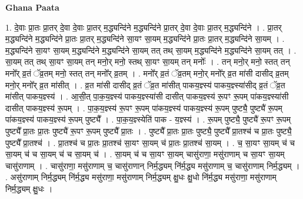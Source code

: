 \documentclass[17pt]{extarticle}
\begin{document}
\textbf{Ghana Paata } \newline

1. दे॒वाः प्रा॒तः प्रा॒तर् दे॒वा दे॒वाः प्रा॒तर् म॒द्ध्यन्दि॑ने म॒द्ध्यन्दि॑ने प्रा॒तर् दे॒वा दे॒वाः प्रा॒तर् म॒द्ध्यन्दि॑ने । . प्रा॒तर् म॒द्ध्यन्दि॑ने म॒द्ध्यन्दि॑ने प्रा॒तः प्रा॒तर् म॒द्ध्यन्दि॑ने सा॒यꣳ सा॒यम् म॒द्ध्यन्दि॑ने प्रा॒तः प्रा॒तर् म॒द्ध्यन्दि॑ने सा॒यम् । . म॒द्ध्यन्दि॑ने सा॒यꣳ सा॒यम् म॒द्ध्यन्दि॑ने म॒द्ध्यन्दि॑ने सा॒यम् तत् तथ् सा॒यम् म॒द्ध्यन्दि॑ने म॒द्ध्यन्दि॑ने सा॒यम् तत् । . सा॒यम् तत् तथ् सा॒यꣳ सा॒यम् तन् मनो॒र् मनो॒ स्तथ् सा॒यꣳ सा॒यम् तन् मनोः᳚ । . तन् मनो॒र् मनो॒ स्तत् तन् मनो᳚र् व्र॒तं ॅव्र॒तम् मनो॒ स्तत् तन् मनो᳚र् व्र॒तम् । . मनो᳚र् व्र॒तं ॅव्र॒तम् मनो॒र् मनो᳚र् व्र॒त मा॑सी दासीद् व्र॒तम् मनो॒र् मनो᳚र् व्र॒त मा॑सीत् । . व्र॒त मा॑सी दासीद् व्र॒तं ॅव्र॒त मा॑सीत् पाकय॒ज्ञ्स्य॑ पाकय॒ज्ञ्स्या॑सीद् व्र॒तं ॅव्र॒त मा॑सीत् पाकय॒ज्ञ्स्य॑ । . आ॒सी॒त् पा॒क॒य॒ज्ञ्स्य॑ पाकय॒ज्ञ्स्या॑सी दासीत् पाकय॒ज्ञ्स्य॑ रू॒पꣳ रू॒पम् पा॑कय॒ज्ञ्स्या॑सी दासीत् पाकय॒ज्ञ्स्य॑ रू॒पम् । . पा॒क॒य॒ज्ञ्स्य॑ रू॒पꣳ रू॒पम् पा॑कय॒ज्ञ्स्य॑ पाकय॒ज्ञ्स्य॑ रू॒पम् पुष्ट्यै॒ पुष्ट्यै॑ रू॒पम् पा॑कय॒ज्ञ्स्य॑ पाकय॒ज्ञ्स्य॑ रू॒पम् पुष्ट्यै᳚ । . पा॒क॒य॒ज्ञ्स्येति॑ पाक - य॒ज्ञ्स्य॑ । . रू॒पम् पुष्ट्यै॒ पुष्ट्यै॑ रू॒पꣳ रू॒पम् पुष्ट्यै᳚ प्रा॒तः प्रा॒तः पुष्ट्यै॑ रू॒पꣳ रू॒पम् पुष्ट्यै᳚ प्रा॒तः । . पुष्ट्यै᳚ प्रा॒तः प्रा॒तः पुष्ट्यै॒ पुष्ट्यै᳚ प्रा॒तश्च॑ च प्रा॒तः पुष्ट्यै॒ पुष्ट्यै᳚ प्रा॒तश्च॑ । . प्रा॒तश्च॑ च प्रा॒तः प्रा॒तश्च॑ सा॒यꣳ सा॒यम् च॑ प्रा॒तः प्रा॒तश्च॑ सा॒यम् । . च॒ सा॒यꣳ सा॒यम् च॑ च सा॒यम् च॑ च सा॒यम् च॑ च सा॒यम् च॑ । . सा॒यम् च॑ च सा॒यꣳ सा॒यम् चासु॑राणा॒ मसु॑राणाम् च सा॒यꣳ सा॒यम् चासु॑राणाम् । . चासु॑राणा॒ मसु॑राणाम् च॒ चासु॑राणान् निर्म॒द्ध्यम् नि॑र्म॒द्ध्य मसु॑राणाम् च॒ चासु॑राणाम् निर्म॒द्ध्यम् । . असु॑राणाम् निर्म॒द्ध्यम् नि॑र्म॒द्ध्य मसु॑राणा॒ मसु॑राणाम् निर्म॒द्ध्यम् क्षु॒धः क्षु॒धो नि॑र्म॒द्ध्य मसु॑राणा॒ मसु॑राणाम् निर्म॒द्ध्यम् क्षु॒धः । \newline
\end{document}
